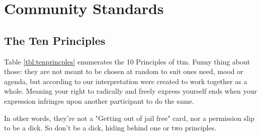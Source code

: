 


\section*{Community Standards}

\subsection*{The Ten Principles}\label{tenprinciples}
Table \ref{tbl:tenprincples} enumerates the 10 Principles of \gls{ttm}.
Funny thing about those: they are not meant to be chosen at random to suit ones need, mood or agenda, but according to our interpretation were created to work together as a whole.  
Meaning your right to radically and freely express yourself ends when your expression infringes upon another participant to do the same. 

In other words, they're not a "Getting out of jail free" card, nor a permission slip to be a dick. So don't be a dick, hiding behind one or two principles. 

